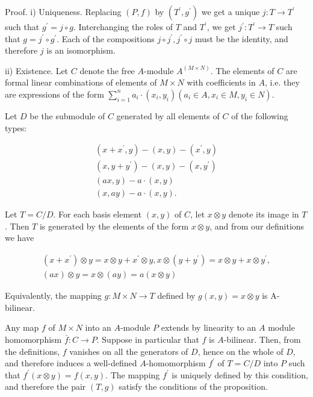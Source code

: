 \documentclass{standalone}
\theoremstyle{definition}
\theoremstyle{remark}
\begin{document}
Proof. i) Uniqueness. Replacing $(P, f)$ by $\left(T^{\prime}, g^{\prime}\right)$ we get a unique $j: T \rightarrow T^{\prime}$ such that $g^{\prime}=j \circ g$. Interchanging the roles of $T$ and $T^{\prime}$, we get $j^{\prime}: T^{\prime} \rightarrow T$ such that $g=j^{\prime} \circ g^{\prime}$. Each of the compositions $j \circ j^{\prime}, j^{\prime} \circ j$ must be the identity, and therefore $j$ is an isomorphism.

ii) Existence. Let $C$ denote the free $A$-module $A^{(M \times N)}$. The elements of $C$ are formal linear combinations of elements of $M \times N$ with coefficients in $A$, i.e. they are expressions of the form $\sum_{i=1}^{n} a_{i} \cdot\left(x_{i}, y_{i}\right)\left(a_{i} \in A, x_{i} \in M, y_{i} \in N\right)$.

Let $D$ be the submodule of $C$ generated by all elements of $C$ of the following types:

\[
\begin{gathered}
\left(x+x^{\prime}, y\right)-(x, y)-\left(x^{\prime}, y\right) \\
\left(x, y+y^{\prime}\right)-(x, y)-\left(x, y^{\prime}\right) \\
(a x, y)-a \cdot(x, y) \\
(x, a y)-a \cdot(x, y) .
\end{gathered}
\]

Let $T=C / D$. For each basis element $(x, y)$ of $C$, let $x \otimes y$ denote its image in $T$. Then $T$ is generated by the elements of the form $x \otimes y$, and from our definitions we have

\[
\begin{gathered}
\left(x+x^{\prime}\right) \otimes y=x \otimes y+x^{\prime} \otimes y, x \otimes\left(y+y^{\prime}\right)=x \otimes y+x \otimes y^{\prime}, \\
(a x) \otimes y=x \otimes(a y)=a(x \otimes y)
\end{gathered}
\]

Equivalently, the mapping $g: M \times N \rightarrow T$ defined by $g(x, y)=x \otimes y$ is A-bilinear.

Any map $f$ of $M \times N$ into an $A$-module $P$ extends by linearity to an $A$ module homomorphism $\bar{f}: C \rightarrow P$. Suppose in particular that $f$ is $A$-bilinear. Then, from the definitions, $f$ vanishes on all the generators of $D$, hence on the whole of $D$, and therefore induces a well-defined $A$-homomorphism $f^{\prime}$ of $T=C / D$ into $P$ such that $f^{\prime}(x \otimes y)=f(x, y)$. The mapping $f^{\prime}$ is uniquely defined by this condition, and therefore the pair $(T, g)$ satisfy the conditions of the proposition.
\end{document}
